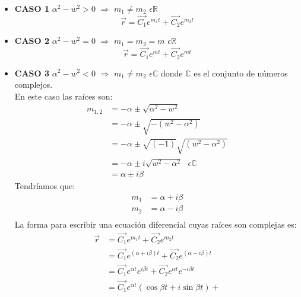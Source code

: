 \documentclass[12pt,openany]{book}
\begin{document}
				\begin{itemize}
					\item \textbf{CASO 1} $\alpha^{2}-w^{2}>0$ $\Rightarrow$ $m_{1}\neq m_{2}$  $\epsilon \mathbb{R}$ \\
						$$
							\vec{r}=\vec{C_{1}}e^{m_{1}t}+\vec{C_{2}}e^{m_{2}t}
						$$
					\item \textbf{CASO 2} $\alpha^{2}-w^{2}=0$ $\Rightarrow$ $m_{1}=m_{2}=m$  $\epsilon \mathbb{R}$ \\
						$$
							\vec{r}=\vec{C_{1}}e^{mt}+\vec{C_{2}}e^{mt}
						$$
					\item \textbf{CASO 3} $\alpha^{2}-w^{2}<0$ $\Rightarrow$ $m_{1}\neq m_{2}$  $\epsilon \mathbb{C}$ donde $\mathbb{C}$
								es el conjunto de n\'umeros complejos.\\
						En este caso las ra\'ices son:
						\begin{equation*}
							\begin{split}
								m_{1,2}&=-\alpha \pm \sqrt{\alpha^{2}-w^{2}}						\\
									   &=-\alpha \pm \sqrt{-(w^{2}-\alpha^{2})}						\\
									   &=-\alpha \pm \sqrt{(-1)}\sqrt{(w^{2}-\alpha^{2})}			\\
									   &=-\alpha \pm i\sqrt{w^{2}-\alpha^{2}} \text{ }\epsilon \mathbb{C}	\\
									   &=\alpha \pm i\beta
							\end{split}
						\end{equation*}
						Tendr\'iamos que:
						\begin{equation*}
							\begin{split}
								m_{1}&=\alpha +i\beta 	\\
								m_{2}&=\alpha -i\beta 	\\
							\end{split}						
						\end{equation*}
						La forma para escribir una ecuaci\'on diferencial cuyas ra\'ices son complejas es:
						\begin{equation*}
							\begin{split}
								\vec{r}&=\vec{C_{1}}e^{m_{1}t}+\vec{C_{2}}e^{m_{2}t}								\\
									   &=\vec{C_{1}}e^{(\alpha +i\beta)t}+\vec{C_{2}}e^{(\alpha -i\beta)t}			\\
									   &=\vec{C_{1}}e^{\alpha t}e^{i\beta t}+\vec{C_{2}}e^{\alpha t}e^{-i\beta t}	\\
									   &=\vec{C_{1}}e^{\alpha t}(\cos\beta t+i\sin \beta t)+

\end{split}
\end{equation*}
\end{itemize}
\end{document}
